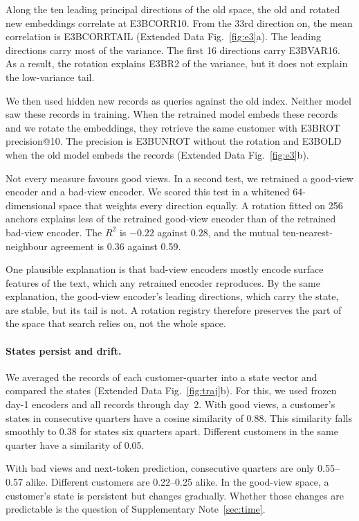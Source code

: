 \documentclass[11pt]{article}
\begin{document}
Along the ten leading principal directions of the old space, the old and rotated new embeddings correlate at E3BCORR10. From the 33rd direction on, the mean correlation is E3BCORRTAIL (Extended Data Fig.~\ref{fig:e3}a). The leading directions carry most of the variance. The first 16 directions carry E3BVAR16. As a result, the rotation explains E3BR2 of the variance, but it does not explain the low-variance tail.

We then used hidden new records as queries against the old index. Neither model saw these records in training. When the retrained model embeds these records and we rotate the embeddings, they retrieve the same customer with E3BROT precision@10. The precision is E3BUNROT without the rotation and E3BOLD when the old model embeds the records (Extended Data Fig.~\ref{fig:e3}b).

Not every measure favours good views. In a second test, we retrained a good-view encoder and a bad-view encoder. We scored this test in a whitened 64-dimensional space that weights every direction equally. A rotation fitted on 256 anchors explains less of the retrained good-view encoder than of the retrained bad-view encoder. The $R^2$ is $-0.22$ against $0.28$, and the mutual ten-nearest-neighbour agreement is 0.36 against 0.59.

One plausible explanation is that bad-view encoders mostly encode surface features of the text, which any retrained encoder reproduces. By the same explanation, the good-view encoder's leading directions, which carry the state, are stable, but its tail is not. A rotation registry therefore preserves the part of the space that search relies on, not the whole space.

\paragraph{States persist and drift.} We averaged the records of each customer-quarter into a state vector and compared the states (Extended Data Fig.~\ref{fig:traj}b). For this, we used frozen day-1 encoders and all records through day~2. With good views, a customer's states in consecutive quarters have a cosine similarity of 0.88. This similarity falls smoothly to 0.38 for states six quarters apart. Different customers in the same quarter have a similarity of 0.05.

With bad views and next-token prediction, consecutive quarters are only 0.55--0.57 alike. Different customers are 0.22--0.25 alike. In the good-view space, a customer's state is persistent but changes gradually. Whether those changes are predictable is the question of Supplementary Note~\ref{sec:time}.
\end{document}
